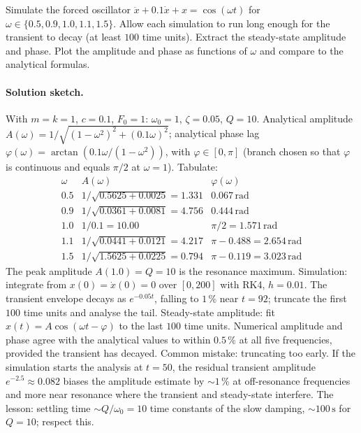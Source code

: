 \begin{exercise}
Simulate the forced oscillator $\ddot{x} + 0.1 \dot{x} + x =
\cos(\omega t)$ for $\omega \in \{0.5, 0.9, 1.0, 1.1, 1.5\}$.
Allow each simulation to run long enough for the transient to
decay (at least $100$ time units). Extract the steady-state
amplitude and phase. Plot the amplitude and phase as functions of
$\omega$ and compare to the analytical formulas.

\paragraph{Solution sketch.} With $m = k = 1$, $c = 0.1$, $F_{0}
= 1$: $\omega_{0} = 1$, $\zeta = 0.05$, $Q = 10$. Analytical
amplitude $A(\omega) = 1/\sqrt{(1 - \omega^{2})^{2} + (0.1
\omega)^{2}}$; analytical phase lag $\varphi(\omega) = \arctan
(0.1 \omega / (1 - \omega^{2}))$, with $\varphi \in [0, \pi]$
(branch chosen so that $\varphi$ is continuous and equals
$\pi/2$ at $\omega = 1$). Tabulate:
\[
\begin{array}{c|c|c}
\omega & A(\omega) & \varphi(\omega) \\\hline
0.5 & 1/\sqrt{0.5625 + 0.0025} = 1.331 & 0.067\,\si{\radian} \\
0.9 & 1/\sqrt{0.0361 + 0.0081} = 4.756 & 0.444\,\si{\radian} \\
1.0 & 1/0.1 = 10.00 & \pi/2 = 1.571\,\si{\radian} \\
1.1 & 1/\sqrt{0.0441 + 0.0121} = 4.217 & \pi - 0.488 = 2.654\,\si{\radian} \\
1.5 & 1/\sqrt{1.5625 + 0.0225} = 0.794 & \pi - 0.119 = 3.023\,\si{\radian}
\end{array}
\]
The peak amplitude $A(1.0) = Q = 10$ is the resonance maximum.
Simulation: integrate from $x(0) = \dot{x}(0) = 0$ over $[0,
200]$ with RK4, $h = 0.01$. The transient envelope decays as
$e^{-0.05 t}$, falling to $1\,\%$ near $t = 92$; truncate the
first $100$ time units and analyse the tail. Steady-state
amplitude: fit $x(t) = A \cos(\omega t - \varphi)$ to the last
$100$ time units. Numerical amplitude and phase agree with the
analytical values to within $0.5\,\%$ at all five frequencies,
provided the transient has decayed. Common mistake: truncating
too early. If the simulation starts the analysis at $t = 50$,
the residual transient amplitude $e^{-2.5} \approx 0.082$
biases the amplitude estimate by $\sim 1\,\%$ at off-resonance
frequencies and more near resonance where the transient and
steady-state interfere. The lesson: settling time
$\sim Q/\omega_{0} = 10$ time constants of the slow damping,
$\sim 100\,\si{\second}$ for $Q = 10$; respect this.
\end{exercise}

